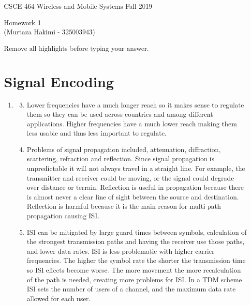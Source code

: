 \documentclass[11pt]{article}
\begin{document}
\newcommand{\answer}[1]{\mbox{~}}

{\large  CSCE 464 Wireless and Mobile Systems  \hfill Fall 2019\\
 \begin{center}
   Homework 1 \\
   ({Murtaza Hakimi - 325003943}) \\
    \end{center}
}

Remove all {highlights} before typing your answer.

\section{Signal Encoding}
\begin{enumerate}[label=(\alph*)]
\item {
	\begin{enumerate}[label=(\arabic*)]
		\setcounter{enumii}{2}
 		\item {
			Lower frequencies have a much longer reach so it makes sense to regulate them 
			so they can be used across countries and among different applications. Higher frequencies
			have a much lower reach making them less usable and thus less important to regulate.
		}
		
		\setcounter{enumii}{7}
  		\item {
			Problems of signal propagation included, attenuation, diffraction, scattering, refraction and reflection.
			Since signal propagation is unpredictable it will not always travel in a straight line. For example, the 
			transmitter and receiver could be moving, or the signal could degrade over distance or terrain. Reflection
			is useful in propagation because there is almost never a clear line of sight between the source and 
			destination. Reflection is harmful because it is the main reason for multi-path propagation causing ISI.
		}
		
		\setcounter{enumii}{8}
  		\item {
			ISI can be mitigated by large guard times between symbols, calculation of the strongest transmission paths and having 
			the receiver use those paths, and lower data rates. ISI is less problematic with higher carrier frequencies. 
			The higher the symbol rate the shorter the transmission time so ISI effects become worse. The more movement
			the more recalculation of the path is needed, creating more problems for ISI. In a TDM scheme ISI sets the number of 						users of a channel, and the maximum data rate allowed for each user.
		}
		

\end{enumerate}}
\end{enumerate}
\end{document}
